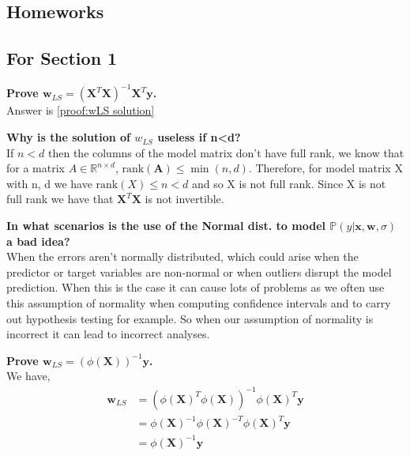 \begin{appendices}
\section{Homeworks}
\subsection{For Section 1}
\begin{question}
    \textbf{Prove $\bm{w}_{LS} = (\bm{X}^{T} \bm{X})^{-1} \bm{X}^{T} \bm{y}$.} \\
    Answer is \cref{proof:wLS solution}
\end{question}

\begin{question}
    \textbf{Why is the solution of $w_{LS}$ useless if n<d?} \\
    If $n<d$ then the columns of the model matrix don't have full rank, we know that for a matrix $A \in \mathbb{R}^{n \times d} $, $\text{rank}(\bm{A}) \leq \min(n,d)$. Therefore, for model matrix X with n, d we have $\text{rank}(X) \leq n < d$ and so X is not full rank. Since X is not full rank we have that $\bm{X}^{T} \bm{X}$ is not invertible.
\end{question}

\begin{question}
    \textbf{In what scenarios is the use of the Normal dist. to model $\mathbb{P}(y|\bm{x},\bm{w},\sigma)$ a bad idea?} \\
    When the errors aren't normally distributed, which could arise when the predictor or target variables are non-normal or when outliers disrupt the model prediction. 
    When this is the case it can cause lots of problems as we often use this assumption of normality when computing confidence intervals and to carry out hypothesis testing for example. So when our assumption of normality is incorrect it can lead to incorrect analyses. 
\end{question}

\begin{question}\label{q:b4}
    \textbf{Prove $\bm{w}_{LS} = (\phi(\bm{X}))^{-1} \bm{y}$.} \\
    We have,
    \begin{align}
        \bm{w}_{LS} {}& = (\phi(\bm{X})^{T} \phi(\bm{X}))^{-1} \phi(\bm{X})^{T} \bm{y} \\
        & = \phi(\bm{X})^{-1} \phi(\bm{X})^{-T} \phi(\bm{X})^{T} \bm{y} \\
        & = \phi(\bm{X})^{-1} \bm{y}
    \end{align}
\end{question}


\end{appendices}
